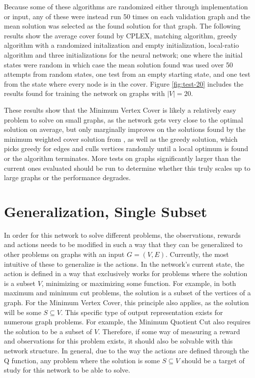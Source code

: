 \documentclass{article}
\begin{document}
Because some of these algorithms are randomized either through implementation or input, any of these were instead run 50 times on each validation graph and the mean solution was selected as the found solution for that graph. The following results show the average cover found by CPLEX, matching algorithm, greedy algorithm with a randomized initalization and empty initialization, local-ratio algorithm and three initializations for the neural network; one where the initial states were random in which case the mean solution found was used over 50 attempts from random states, one test from an empty starting state, and one test from the state where every node is in the cover. Figure \ref{fig:test-20} includes the results found for training the network on graphs with $|V| = 20$.

These results show that the Minimum Vertex Cover is likely a relatively easy problem to solve on small graphs, as the network gets very close to the optimal solution on average, but only marginally improves on the solutions found by the minimum weighted cover solution from \cite{min-weighted-cover-bar}, as well as the greedy solution, which picks greedy for edges and culls vertices randomly until a local optimum is found or the algorithm terminates. More tests on graphs significantly larger than the current ones evaluated should be run to determine whether this truly scales up to large graphs or the performance degrades.

\section{Generalization, Single Subset}\label{sec:generalization-single-subset}

In order for this network to solve different problems, the observations, rewards and actions needs to be modified in such a way that they can be generalized to other problems on graphs with an input $G = (V, E)$. Currently, the most intuitive of these to generalize is the actions. In the network's current state, the action is defined in a way that exclusively works for problems where the solution is a subset $V$, minimizing or maximizing some function. For example, in both maximum and minimum cut problems, the solution is a subset of the vertices of a graph. For the Minimum Vertex Cover, this principle also applies, as the solution will be some $S \subseteq V$. This specific type of output representation exists for numerous graph problems. For example, the Minimum Quotient Cut also requires the solution to be a subset of $V$. Therefore, if some way of measuring a reward and observations for this problem exists, it should also be solvable with this network structure. In general, due to the way the actions are defined through the Q function, any problem where the solution is some $S \subseteq V$ should be a target of study for this network to be able to solve. 
\end{document}
